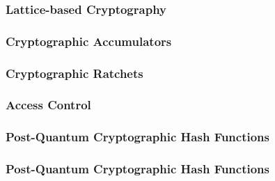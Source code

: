 \subsubsection{Lattice-based Cryptography}\label{future_sec:lattice_based_cryptography}
\subsubsection{Cryptographic Accumulators}\label{future_sec:cryptographic_accumulators}
\subsubsection{Cryptographic Ratchets}\label{future_sec:cryptographic_ratchets}
\subsubsection{Access Control}\label{future_sec:access_control}
\subsubsection{Post-Quantum Cryptographic Hash Functions}\label{future_sec:hash_functions:cryptographic_hash_function:post_quantum}

\vspace{-1.5mm}
\newpage





























\subsubsection{Post-Quantum Cryptographic Hash Functions}\label{future_sec:hash_functions:cryptographic_hash_function:post_quantum}

































